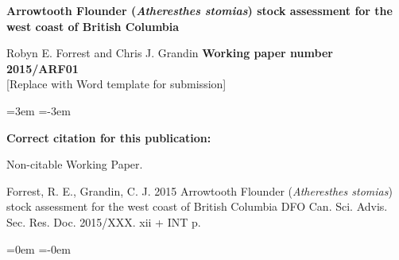 
\thispagestyle{fancyplain}

\begin{flushleft}
\LARGE \textbf{Arrowtooth Flounder ({\bf \emph{Atheresthes stomias}}) stock assessment for the west coast of British Columbia}

\end{flushleft}
\vfill
{\Large Robyn E. Forrest and Chris J. Grandin}
\vfill
\vfill
\vfill
{\LARGE \textbf{Working paper number 2015/ARF01}}\\
\vspace{2cm}
[Replace with Word template for submission]
\vfill
\clearpage

\renewcommand{\contentsname}{\bf \large \vspace{-25mm} TABLE OF CONTENTS}

\begin{center}
\tableofcontents
\end{center}
\newpage

\leftskip=3em	%
\parindent=-3em

{\bf Correct citation for this publication:}

Non-citable Working Paper.	%

Forrest, R. E., Grandin, C. J. 2015
Arrowtooth Flounder (\emph{Atheresthes stomias}) stock assessment for the west coast of British Columbia
DFO Can. Sci. Advis. Sec. Res. Doc. 2015/XXX. xii + INT p.

\leftskip=0em	%
\parindent=-0em
